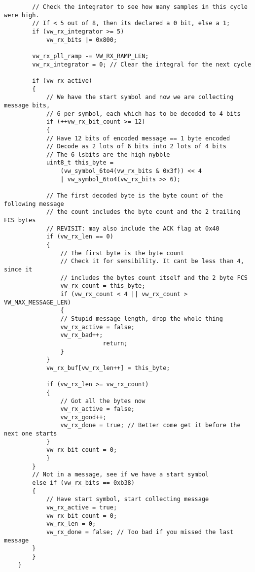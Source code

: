 \begin{verbatim}
        // Check the integrator to see how many samples in this cycle were high.
        // If < 5 out of 8, then its declared a 0 bit, else a 1;
        if (vw_rx_integrator >= 5)
            vw_rx_bits |= 0x800;

        vw_rx_pll_ramp -= VW_RX_RAMP_LEN;
        vw_rx_integrator = 0; // Clear the integral for the next cycle

        if (vw_rx_active)
        {
            // We have the start symbol and now we are collecting message bits,
            // 6 per symbol, each which has to be decoded to 4 bits
            if (++vw_rx_bit_count >= 12)
            {
            // Have 12 bits of encoded message == 1 byte encoded
            // Decode as 2 lots of 6 bits into 2 lots of 4 bits
            // The 6 lsbits are the high nybble
            uint8_t this_byte = 
                (vw_symbol_6to4(vw_rx_bits & 0x3f)) << 4 
                | vw_symbol_6to4(vw_rx_bits >> 6);

            // The first decoded byte is the byte count of the following message
            // the count includes the byte count and the 2 trailing FCS bytes
            // REVISIT: may also include the ACK flag at 0x40
            if (vw_rx_len == 0)
            {
                // The first byte is the byte count
                // Check it for sensibility. It cant be less than 4, since it
                // includes the bytes count itself and the 2 byte FCS
                vw_rx_count = this_byte;
                if (vw_rx_count < 4 || vw_rx_count > VW_MAX_MESSAGE_LEN)
                {
                // Stupid message length, drop the whole thing
                vw_rx_active = false;
                vw_rx_bad++;
                            return;
                }
            }
            vw_rx_buf[vw_rx_len++] = this_byte;

            if (vw_rx_len >= vw_rx_count)
            {
                // Got all the bytes now
                vw_rx_active = false;
                vw_rx_good++;
                vw_rx_done = true; // Better come get it before the next one starts
            }
            vw_rx_bit_count = 0;
            }
        }
        // Not in a message, see if we have a start symbol
        else if (vw_rx_bits == 0xb38)
        {
            // Have start symbol, start collecting message
            vw_rx_active = true;
            vw_rx_bit_count = 0;
            vw_rx_len = 0;
            vw_rx_done = false; // Too bad if you missed the last message
        }
        }
    }


\end{verbatim}
